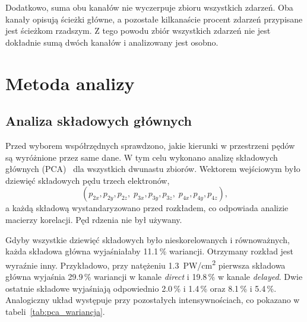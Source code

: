 \documentclass[12pt,a4paper]{article}
\newcommand{\PWcm}{PW/cm\textsuperscript{2}}
\begin{document}
Dodatkowo, suma obu kanałów nie wyczerpuje zbioru wszystkich zdarzeń. Oba kanały
opisują ścieżki główne, a pozostałe kilkanaście procent
zdarzeń przypisane jest ścieżkom rzadszym. Z tego powodu zbiór
wszystkich zdarzeń nie jest dokładnie sumą dwóch kanałów i
analizowany jest osobno.

\section{Metoda analizy}
\label{sec:metoda}

\subsection{Analiza składowych głównych}
\label{sec:pca}

Przed wyborem współrzędnych sprawdzono, jakie kierunki w przestrzeni
pędów są wyróżnione przez same dane. W tym celu wykonano
analizę składowych głównych (PCA)~\cite{Jolliffe2002} dla wszystkich
dwunastu zbiorów. Wektorem wejściowym było dziewięć składowych
pędu trzech elektronów,
\begin{equation}
(p_{2x},p_{2y},p_{2z},\;p_{3x},p_{3y},p_{3z},\;p_{4x},p_{4y},p_{4z}),
\end{equation}
a każdą składową wystandaryzowano przed rozkładem, co odpowiada
analizie macierzy korelacji. Pęd rdzenia nie był używany.

Gdyby wszystkie dziewięć składowych było nieskorelowanych i
równoważnych, każda składowa główna wyjaśniałaby
\num{11.1}\,\% wariancji. Otrzymany rozkład jest wyraźnie inny.
Przykładowo, przy natężeniu \num{1.3}~\PWcm{} pierwsza składowa
główna wyjaśnia \num{29.9}\,\% wariancji w kanale \emph{direct}
i \num{19.8}\,\% w kanale \emph{delayed}. Dwie ostatnie składowe
wyjaśniają odpowiednio \num{2.0}\,\% i \num{1.4}\,\% oraz
\num{8.1}\,\% i \num{5.4}\,\%. Analogiczny układ występuje przy
pozostałych intensywnościach, co pokazano w
tabeli~\ref{tab:pca_wariancja}.
\end{document}
